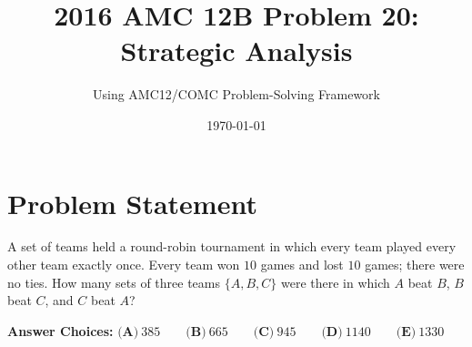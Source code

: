 \documentclass[]{article}
\title{\textbf{2016 AMC 12B Problem 20: Strategic Analysis}}
\author{Using AMC12/COMC Problem-Solving Framework}
\date{\today}
\begin{document}
\maketitle

\section*{Problem Statement}
A set of teams held a round-robin tournament in which every team played every other team exactly once. Every team won $10$ games and lost $10$ games; there were no ties. How many sets of three teams $\{A, B, C\}$ were there in which $A$ beat $B$, $B$ beat $C$, and $C$ beat $A$?

\textbf{Answer Choices:} 
$\textbf{(A)}\ 385 \qquad \textbf{(B)}\ 665 \qquad \textbf{(C)}\ 945 \qquad \textbf{(D)}\ 1140 \qquad \textbf{(E)}\ 1330$
\end{document}
